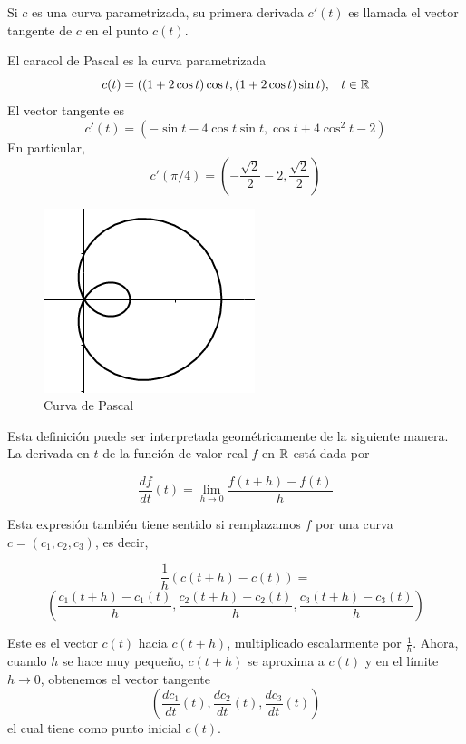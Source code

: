 \begin{definition}
    Si $c$ es una curva parametrizada, su primera derivada $c'(t)$ es llamada el vector tangente
    de $c$ en el punto $c(t)$.
\end{definition}

\begin{myExample}
    El caracol de Pascal es la curva parametrizada
    $$ c(t)=((1+2\cos{t})\cos{t},(1+2\cos{t})\sin{t})\text{,} \quad t \in \mathbb{R}$$
    El vector tangente es
    $$ c'(t)=(-\sin{t}-4\cos{t}\sin{t},\cos{t}+4\cos^{2}{t}-2)$$
    En particular,
    $$ c'(\pi/4) = (-\frac{\sqrt{2}}{2}-2,\frac{\sqrt{2}}{2})$$
\end{myExample}

\begin{figure}[!ht]
  \begin{center}
      \includegraphics[width=0.7\linewidth]{gfx/limacon2}
      \caption{Curva de Pascal}
      \label{fig:boat1}
  \end{center}
\end{figure}


Esta definición puede ser interpretada geom\'etricamente de la siguiente manera. La derivada en
$t$ de la función de valor real $f$ en $\mathbb{R}$ est\'a dada por

$$ \frac{df}{dt}(t) = \lim_{h \rightarrow 0} \frac{f(t+h)-f(t)}{h} $$

Esta expresión también tiene sentido si remplazamos $f$ por una curva $c = (c_{1},c_{2},c_{3})$,
es decir,

$$ \frac{1}{h}(c(t+h)-c(t)) =$$
$$\left( \frac{c_{1}(t+h)-c_{1}(t)}{h},\frac{c_{2}(t+h)-c_{2}(t)}{h},\frac{c_{3}(t+h)-c_{3}(t)}{h} \right) $$

Este es el vector $c(t)$ hacia $c(t+h)$, multiplicado escalarmente por $\frac{1}{h}$. Ahora, cuando $h$ se hace
muy pequeño, $c(t+h)$ se aproxima a $c(t)$ y en el límite $h \rightarrow 0$, obtenemos el vector tangente
$$\left( \frac{dc_{1}}{dt}(t),\frac{dc_{2}}{dt}(t),\frac{dc_{3}}{dt}(t) \right) $$
el cual tiene como punto inicial $c(t)$.

